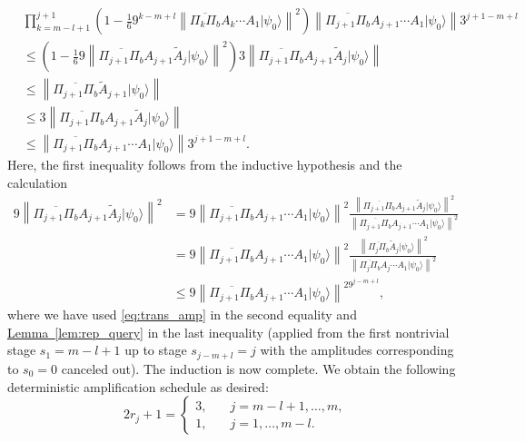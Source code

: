 \documentclass[letterpaper,onecolumn,11pt,accepted=2026-02-14]{quantumarticle}
\newcommand{\norm}[1]{\left\lVert#1\right\rVert}
\theoremstyle{remark}
\theoremstyle{plain}
\newcommand{\eq}[1]{\cref{eq:#1}}
\newcommand{\lem}[1]{\hyperref[lem:#1]{Lemma~\ref*{lem:#1}}}
\newcommand{\ket}[1]{|#1\rangle}
\begin{document}
\begin{equation}
\begin{aligned}
    &\prod_{k=m-l+1}^{j+1}\left(1-\frac{1}{6}9^{k-m+l}\norm{\overline{\Pi_{k}\Pi_b}A_k\cdots A_1\ket{\psi_0}}^2\right)\norm{\overline{\Pi_{j+1}\Pi_b}A_{j+1}\cdots A_1\ket{\psi_0}}3^{j+1-m+l}\\
    &\leq\left(1-\frac{1}{6}9\norm{\overline{\Pi_{j+1}\Pi_b}A_{j+1}\widetilde A_{j}\ket{\psi_0}}^2\right)3\norm{\overline{\Pi_{j+1}\Pi_b}A_{j+1}\widetilde A_{j}\ket{\psi_0}}\\
    &\leq\norm{\overline{\Pi_{j+1}\Pi_b}\widetilde A_{j+1}\ket{\psi_0}}\\
    &\leq3\norm{\overline{\Pi_{j+1}\Pi_b}A_{j+1}\widetilde A_{j}\ket{\psi_0}}\\
    &\leq\norm{\overline{\Pi_{j+1}\Pi_b}A_{j+1}\cdots A_1\ket{\psi_0}}3^{j+1-m+l}.
\end{aligned}
\end{equation}
Here, the first inequality follows from the inductive hypothesis and the calculation
\begin{equation*}
\begin{aligned}
    9\norm{\overline{\Pi_{j+1}\Pi_b}A_{j+1}\widetilde A_{j}\ket{\psi_0}}^2
    &=9\norm{\overline{\Pi_{j+1}\Pi_b}A_{j+1}\cdots A_1\ket{\psi_0}}^2
    \frac{\norm{\overline{\Pi_{j+1}\Pi_b}A_{j+1}\widetilde A_{j}\ket{\psi_0}}^2}{\norm{\overline{\Pi_{j+1}\Pi_b}A_{j+1}\cdots A_1\ket{\psi_0}}^2}\\
    &=9\norm{\overline{\Pi_{j+1}\Pi_b}A_{j+1}\cdots A_1\ket{\psi_0}}^2
    \frac{\norm{\overline{\Pi_{j}\Pi_b}\widetilde A_{j}\ket{\psi_0}}^2}{\norm{\overline{\Pi_{j}\Pi_b}A_{j}\cdots A_1\ket{\psi_0}}^2}\\
    &\leq 9\norm{\overline{\Pi_{j+1}\Pi_b}A_{j+1}\cdots A_1\ket{\psi_0}}^29^{j-m+l},
\end{aligned}
\end{equation*}
where we have used \eq{trans_amp} in the second equality and \lem{rep_query} in the last inequality (applied from the first nontrivial stage $s_1=m-l+1$ up to stage $s_{j-m+l}=j$ with the amplitudes corresponding to $s_0=0$ canceled out).
The induction is now complete. We obtain the following deterministic amplification schedule as desired:
\begin{equation}
\label{eq:deterministic_schedule2}
    2r_j+1=
    \begin{cases}
        3,\quad &j=m-l+1,\ldots,m,\\
        1,&j=1,\ldots,m-l.
    \end{cases}
\end{equation}
\end{document}
